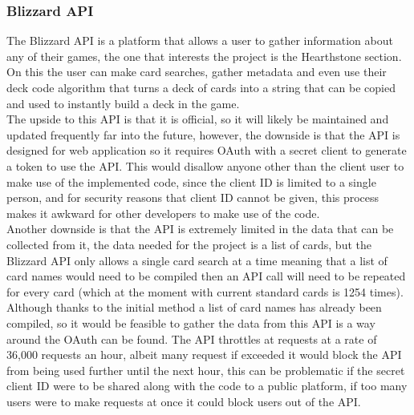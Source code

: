 \documentclass{report} %
\begin{document}
\subsubsection{Blizzard API}
The Blizzard API is a platform that allows a user to gather information about any of their games, the one that interests the project is the Hearthstone section. On this the user can make card searches, gather metadata and even use their deck code algorithm that turns a deck of cards into a string that can be copied and used to instantly build a deck in the game. \\
\indent The upside to this API is that it is official, so it will likely be maintained and updated frequently far into the future, however, the downside is that the API is designed for web application so it requires OAuth with a secret client to generate a token to use the API. This would disallow anyone other than the client user to make use of the implemented code, since the client ID is limited to a single person, and for security reasons that client ID cannot be given, this process makes it awkward for other developers to make use of the code. \\ 
\indent Another downside is that the API is extremely limited in the data that can be collected from it, the data needed for the project is a list of cards, but the Blizzard API only allows a single card search at a time meaning that a list of card names would need to be compiled then an API call will need to be repeated for every card (which at the moment with current standard cards is 1254 times). Although thanks to the initial method a list of card names has already been compiled, so it would be feasible to gather the data from this API is a way around the OAuth can be found. The API throttles at requests at a rate of 36,000 requests an hour, albeit many request if exceeded it would block the API from being used further until the next hour, this can be problematic if the secret client ID were to be shared along with the code to a public platform, if too many users were to make requests at once it could block users out of the API.
\end{document}
